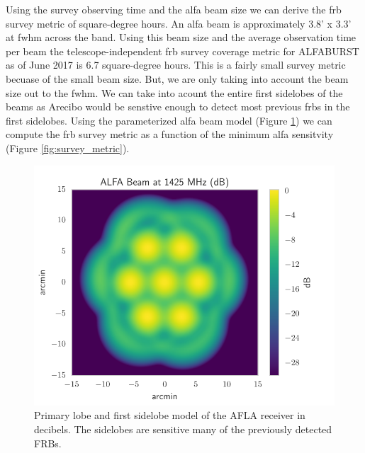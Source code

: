 \documentclass[a4paper,fleqn,usenatbib]{mnras}
\begin{document}
Using the survey observing time and the \gls{alfa} beam size we can derive the
\gls{frb} survey metric of square-degree hours. An \gls*{alfa} beam is
approximately 3.8' x 3.3' at \gls*{fwhm} across the band.  Using this beam size
and the average observation time per beam the telescope-independent \gls*{frb}
survey coverage metric for ALFABURST as of June 2017 is 6.7 square-degree hours.
This is a fairly small survey metric becuase of the small beam size. But, we are
only taking into account the beam size out to the \gls{fwhm}. We can take into
acount the entire first sidelobes of the beams as Arecibo would be senstive
enough to detect most previous \glspl{frb} in the first sidelobes. Using the
parameterized \gls{alfa} beam model (Figure \ref{fig:alfa_beam})
\citep{GALFAbeam} we can compute the \gls{frb} survey metric as a function of
the minimum \gls{alfa} sensitvity (Figure \ref{fig:survey_metric}).

\begin{figure}
    \includegraphics[width=1.0\linewidth]{figures/ALFA_beam_1425MHz_dB.pdf}
    \caption{Primary lobe and first sidelobe model of the AFLA receiver in
    decibels. The sidelobes are sensitive many of the previously detected FRBs.
    }
    \label{fig:alfa_beam}
\end{figure}
\end{document}
